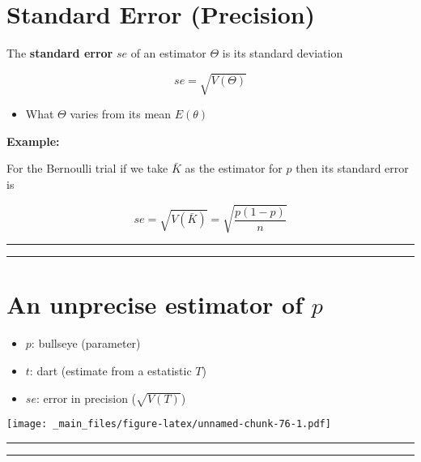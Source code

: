 \documentclass[
]{book}
\providecommand{\tightlist}{%
  \setlength{\itemsep}{0pt}\setlength{\parskip}{0pt}}
\begin{document}
\hypertarget{standard-error-precision}{%
\section{Standard Error (Precision)}\label{standard-error-precision}}

The \textbf{standard error} \(se\) of an estimator \(\Theta\) is its standard deviation

\[se=\sqrt{V(\Theta)}\]

\begin{itemize}
\tightlist
\item
  What \(\Theta\) varies from its mean \(E(\theta)\)
\end{itemize}

\textbf{Example:}

For the Bernoulli trial if we take \(\bar{K}\) as the estimator for \(p\) then its standard error is

\[se=\sqrt{V(\bar{K})}= \sqrt{\frac{p(1-p)}{n}}\]

\begin{center}\rule{0.5\linewidth}{0.5pt}\end{center}

\begin{center}\rule{0.5\linewidth}{0.5pt}\end{center}

\hypertarget{an-unprecise-estimator-of-p}{%
\section{\texorpdfstring{An unprecise estimator of \(p\)}{An unprecise estimator of p}}\label{an-unprecise-estimator-of-p}}

\begin{itemize}
\tightlist
\item
  \(p\): bullseye (parameter)
\item
  \(t\): dart (estimate from a estatistic \(T\))
\item
  \(se\): error in precision (\(\sqrt{V(T)}\))
\end{itemize}

\texttt{[image: \_main\_files/figure-latex/unnamed-chunk-76-1.pdf]}

\begin{center}\rule{0.5\linewidth}{0.5pt}\end{center}

\begin{center}\rule{0.5\linewidth}{0.5pt}\end{center}
\end{document}
